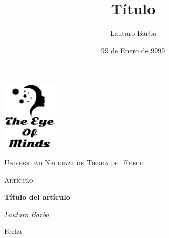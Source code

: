\documentclass[11pt]{article}
\title{Título}
\author{Lautaro Barba}
\date{99 de Enero de 9999}
\begin{document}
\begin{titlepage}
\centering{}
    \includegraphics[width=0.2\textwidth]{LogoCompleto}\par
    \vspace{1cm}
    \textsc{\LARGE{Universidad Nacional de Tierra del Fuego}}\par
    \vspace{1cm}
    \textsc{\Large{Artículo}}\par
    \vspace{1,5cm}
    \huge{\textbf{Título del artículo}}\par
    \vspace{2cm}
    \Large{\textit{Lautaro Barba}}\par
    \vfill{}
    \large{Fecha}\par
\end{titlepage}
\clearpage{}

\maketitle{}
\clearpage{}

\tableofcontents{}
\clearpage{}

\section{}
\end{document}
